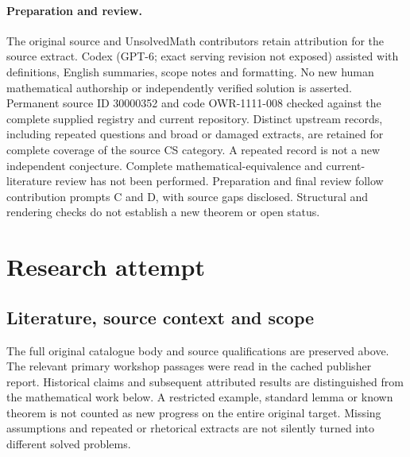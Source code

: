 \documentclass[11pt]{article}
\begin{document}
\paragraph{Preparation and review.}
The original source and UnsolvedMath contributors retain attribution for the source extract. Codex (GPT-6; exact serving revision not exposed) assisted with definitions, English summaries, scope notes and formatting. No new human mathematical authorship or independently verified solution is asserted. Permanent source ID 30000352 and code OWR-1111-008 checked against the complete supplied registry and current repository. Distinct upstream records, including repeated questions and broad or damaged extracts, are retained for complete coverage of the source CS category. A repeated record is not a new independent conjecture. Complete mathematical-equivalence and current-literature review has not been performed. Preparation and final review follow contribution prompts C and D, with source gaps disclosed. Structural and rendering checks do not establish a new theorem or open status.
\label{end:30000352}

\section{Research attempt}
\subsection{Literature, source context and scope}
The full original catalogue body and source qualifications are preserved above. The relevant primary workshop passages were read in the cached publisher report. Historical claims and subsequent attributed results are distinguished from the mathematical work below. A restricted example, standard lemma or known theorem is not counted as new progress on the entire original target. Missing assumptions and repeated or rhetorical extracts are not silently turned into different solved problems.
\end{document}
